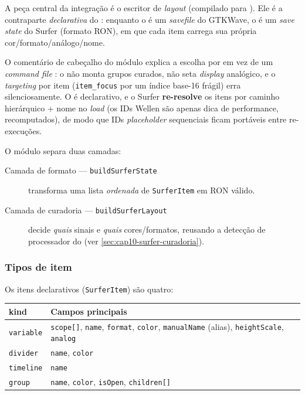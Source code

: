 A peça central da integração é o escritor de \emph{layout}
 (compilado para
). Ele é a contraparte \emph{declarativa} do
: enquanto o  é um \emph{savefile} do GTKWave, o
 é um \emph{save state} do Surfer (formato RON), em que cada item
carrega sua própria cor/formato/análogo/nome.

O comentário de cabeçalho do módulo explica a escolha por  em vez
de um \emph{command file} : o  não monta grupos curados, não
seta \emph{display} analógico, e o \emph{targeting} por item (\lstinline|item_focus|
por um índice base-16 frágil) erra silenciosamente. O  é
declarativo, e o Surfer \textbf{re-resolve} os itens por caminho hierárquico + nome
no \emph{load} (os IDs Wellen são apenas dica de performance, recomputados), de modo
que IDs \emph{placeholder} sequenciais ficam portáveis entre re-execuções.

O módulo separa duas camadas:

\begin{description}
  \item[Camada de formato — \lstinline|buildSurferState|] transforma uma lista
        \emph{ordenada} de \lstinline|SurferItem| em RON válido.
  \item[Camada de curadoria — \lstinline|buildSurferLayout|] decide \emph{quais}
        sinais e \emph{quais} cores/formatos, reusando a detecção de processador do
         (ver \autoref{sec:cap10-surfer-curadoria}).
\end{description}

\subsubsection{Tipos de item}

Os itens declarativos (\lstinline|SurferItem|) são quatro:

\begin{tabularx}{\linewidth}{l Y}
\toprule
\textbf{kind} & \textbf{Campos principais} \\
\midrule
\lstinline|variable| & \lstinline|scope[]|, \lstinline|name|, \lstinline|format|, \lstinline|color|, \lstinline|manualName| (alias), \lstinline|heightScale|, \lstinline|analog| \\
\lstinline|divider|  & \lstinline|name|, \lstinline|color| \\
\lstinline|timeline| & \lstinline|name| \\
\lstinline|group|    & \lstinline|name|, \lstinline|color|, \lstinline|isOpen|, \lstinline|children[]| \\
\bottomrule
\end{tabularx}

